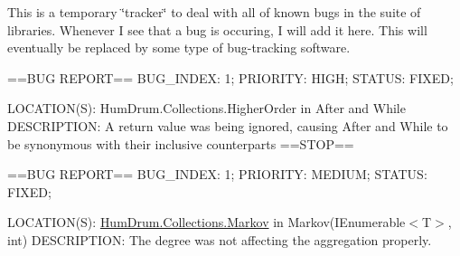 This is a temporary \char`\"{}tracker\char`\"{} to deal with all of known bugs in the suite of libraries. Whenever I see that a bug is occuring, I will add it here. This will eventually be replaced by some type of bug-\/tracking software.

==B\+U\+G R\+E\+P\+O\+R\+T== B\+U\+G\+\_\+\+I\+N\+D\+E\+X\+: 1; P\+R\+I\+O\+R\+I\+T\+Y\+: H\+I\+G\+H; S\+T\+A\+T\+U\+S\+: F\+I\+X\+E\+D;
\begin{DoxyItemize}
\item L\+O\+C\+A\+T\+I\+O\+N(\+S)\+: Hum\+Drum.\+Collections.\+Higher\+Order in After and While D\+E\+S\+C\+R\+I\+P\+T\+I\+O\+N\+: A return value was being ignored, causing After and While to be synonymous with their inclusive counterparts ==S\+T\+O\+P==
\end{DoxyItemize}

==B\+U\+G R\+E\+P\+O\+R\+T== B\+U\+G\+\_\+\+I\+N\+D\+E\+X\+: 1; P\+R\+I\+O\+R\+I\+T\+Y\+: M\+E\+D\+I\+U\+M; S\+T\+A\+T\+U\+S\+: F\+I\+X\+E\+D;
\begin{DoxyItemize}
\item L\+O\+C\+A\+T\+I\+O\+N(\+S)\+: \hyperlink{namespaceHumDrum_1_1Collections_1_1Markov}{Hum\+Drum.\+Collections.\+Markov} in Markov(\+I\+Enumerable$<$\+T$>$, int) D\+E\+S\+C\+R\+I\+P\+T\+I\+O\+N\+: The degree was not affecting the aggregation properly. 
\end{DoxyItemize}